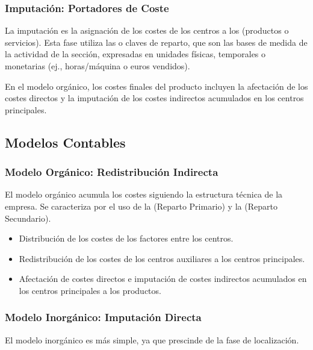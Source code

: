 \subsubsection{Imputación: Portadores de Coste}

La imputación es la asignación de los costes de los centros a los  (productos o servicios). Esta fase utiliza las  o claves de reparto, que son las bases de medida de la actividad de la sección, expresadas en unidades físicas, temporales o monetarias (ej., horas/máquina o euros vendidos).

En el modelo orgánico, los costes finales del producto incluyen la afectación de los costes directos y la imputación de los costes indirectos acumulados en los centros principales.

\subsection{Modelos Contables}

\subsubsection{Modelo Orgánico: Redistribución Indirecta}

El modelo orgánico acumula los costes siguiendo la estructura técnica de la empresa. Se caracteriza por el uso de la  (Reparto Primario) y la  (Reparto Secundario).

\begin{itemize}
    \item {} Distribución de los costes de los factores entre los centros.
    \item {} Redistribución de los costes de los centros auxiliares a los centros principales.
    \item {} Afectación de costes directos e imputación de costes indirectos acumulados en los centros principales a los productos.
\end{itemize}

\subsubsection{Modelo Inorgánico: Imputación Directa}

El modelo inorgánico es más simple, ya que prescinde de la fase de localización.

